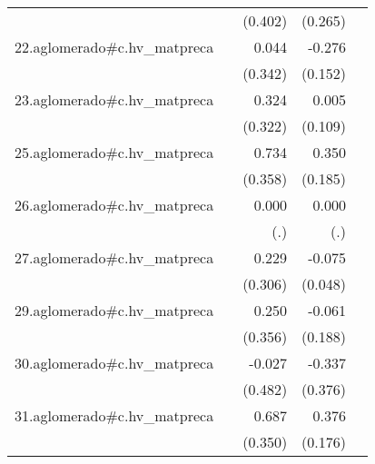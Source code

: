 {\begin{longtable}{l*{4}{D{.}{.}{-1}}}
            &                     &     (0.402)         &     (0.265)         &                     \\
\addlinespace
22.aglomerado#c.hv\_matpreca&                     &       0.044         &      -0.276         &                     \\
            &                     &     (0.342)         &     (0.152)         &                     \\
\addlinespace
23.aglomerado#c.hv\_matpreca&                     &       0.324         &       0.005         &                     \\
            &                     &     (0.322)         &     (0.109)         &                     \\
\addlinespace
25.aglomerado#c.hv\_matpreca&                     &       0.734\sym{*}  &       0.350         &                     \\
            &                     &     (0.358)         &     (0.185)         &                     \\
\addlinespace
26.aglomerado#c.hv\_matpreca&                     &       0.000         &       0.000         &                     \\
            &                     &         (.)         &         (.)         &                     \\
\addlinespace
27.aglomerado#c.hv\_matpreca&                     &       0.229         &      -0.075         &                     \\
            &                     &     (0.306)         &     (0.048)         &                     \\
\addlinespace
29.aglomerado#c.hv\_matpreca&                     &       0.250         &      -0.061         &                     \\
            &                     &     (0.356)         &     (0.188)         &                     \\
\addlinespace
30.aglomerado#c.hv\_matpreca&                     &      -0.027         &      -0.337         &                     \\
            &                     &     (0.482)         &     (0.376)         &                     \\
\addlinespace
31.aglomerado#c.hv\_matpreca&                     &       0.687\sym{*}  &       0.376\sym{*}  &                     \\
            &                     &     (0.350)         &     (0.176)         &                     \\

\end{longtable}}
